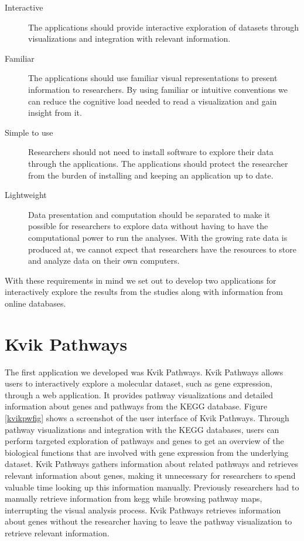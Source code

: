 \begin{description} 
\item[Interactive] The applications should provide interactive exploration
    of datasets through visualizations and integration with relevant
    information.
    
\item[Familiar] The applications should use familiar visual representations to
    present information to researchers. By using familiar or intuitive
        conventions we can reduce the cognitive load needed to read a
        visualization and gain insight from it.\cite{o2018visualization}
    
\item[Simple to use] Researchers should not need to install software to
    explore their data through the applications. The applications should 
    protect the researcher from the burden of installing and keeping an
    application up to date. 
    
\item[Lightweight] Data presentation and computation should be separated
    to make it possible for researchers to explore data without having to
    have the computational power to run the analyses. With the growing rate
    data is produced at, we cannot expect that researchers have the resources to
    store and analyze data on their own computers. 
    
\end{description}

With these requirements in mind we set out to develop two applications for
interactively explore the results from the studies along with information
from online databases. 

\section{Kvik Pathways}
The first application we developed was Kvik Pathways. Kvik Pathways allows users
to interactively explore a molecular dataset, such as gene expression, through a
web application. It provides pathway visualizations and detailed information
about genes and pathways from the KEGG database. Figure \ref{kvikpwfig} shows a
screenshot of the user interface of Kvik Pathways. Through pathway
visualizations and integration with the KEGG databases, users can perform
targeted exploration of pathways and genes to get an overview of the biological
functions that are involved with gene expression from the underlying dataset.
Kvik Pathways gathers information about related pathways and retrieves relevant
information about genes, making it unnecessary for researchers to spend valuable
time looking up this information manually. Previously researchers had to
manually retrieve information from \gls{kegg} while browsing pathway maps,
interrupting the visual analysis process.  Kvik Pathways retrieves information
about genes without the researcher having to leave the pathway visualization to
retrieve relevant information.


